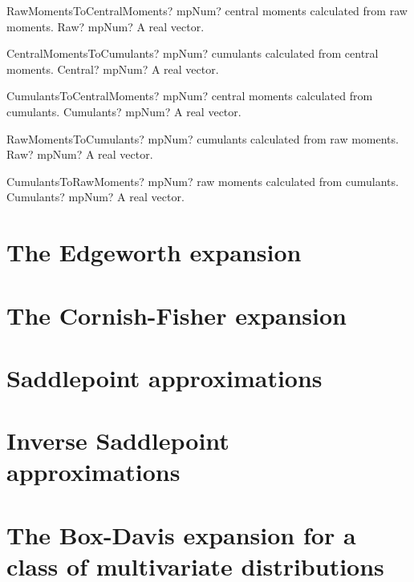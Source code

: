 \documentclass[12pt,a4paper,openany]{book}
\begin{document}
\begin{mpFunctionsExtract}
\mpFunctionOneNotImplemented
{RawMomentsToCentralMoments? mpNum? central moments calculated from raw moments.}
{Raw? mpNum? A real vector.}
\end{mpFunctionsExtract}

\begin{mpFunctionsExtract}
\mpFunctionOneNotImplemented
{CentralMomentsToCumulants? mpNum? cumulants calculated from central moments.}
{Central? mpNum? A real vector.}
\end{mpFunctionsExtract}

\begin{mpFunctionsExtract}
\mpFunctionOneNotImplemented
{CumulantsToCentralMoments? mpNum? central moments calculated from cumulants.}
{Cumulants? mpNum? A real vector.}
\end{mpFunctionsExtract}

\begin{mpFunctionsExtract}
\mpFunctionOneNotImplemented
{RawMomentsToCumulants? mpNum? cumulants calculated from raw moments.}
{Raw? mpNum? A real vector.}
\end{mpFunctionsExtract}

\begin{mpFunctionsExtract}
\mpFunctionOneNotImplemented
{CumulantsToRawMoments? mpNum? raw moments calculated from cumulants.}
{Cumulants? mpNum? A real vector.}
\end{mpFunctionsExtract}

\section{The Edgeworth expansion}

\section{The Cornish-Fisher expansion}

\section{Saddlepoint approximations}

\section{Inverse Saddlepoint approximations}

\section[The Box-Davis expansion]{The Box-Davis expansion for a class of multivariate distributions}
\end{document}
